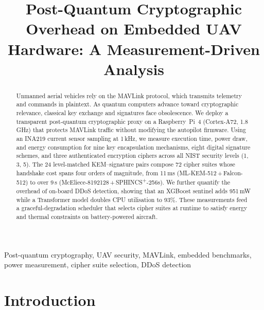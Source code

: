 \documentclass[conference]{IEEEtran}
\begin{document}
\title{Post-Quantum Cryptographic Overhead on Embedded UAV\\Hardware: A Measurement-Driven Analysis}

\author{}

\maketitle

\begin{abstract}
Unmanned aerial vehicles rely on the MAVLink protocol, which transmits
telemetry and commands in plaintext.  As quantum computers advance
toward cryptographic relevance, classical key exchange and signatures
face obsolescence.  We deploy a transparent post-quantum cryptographic
proxy on a Raspberry~Pi~4 (Cortex-A72, 1.8\,GHz) that protects
MAVLink traffic without modifying the autopilot firmware.  Using an
INA219 current sensor sampling at 1\,kHz, we measure execution time,
power draw, and energy consumption for nine key encapsulation
mechanisms, eight digital signature schemes, and three authenticated
encryption ciphers across all NIST security levels (1, 3, 5).
The 24 level-matched KEM--signature pairs compose 72 cipher suites
whose handshake cost spans four orders of magnitude, from 11\,ms
(ML-KEM-512\,+\,Falcon-512) to over 9\,s (McEliece-8192128\,+\,SPHINCS\textsuperscript{+}-256s).
We further quantify the overhead of on-board DDoS detection, showing
that an XGBoost sentinel adds 951\,mW while a Transformer model
doubles CPU utilisation to 93\%.  These measurements feed a graceful-degradation
scheduler that selects cipher suites at runtime to satisfy
energy and thermal constraints on battery-powered aircraft.
\end{abstract}

\begin{IEEEkeywords}
Post-quantum cryptography, UAV security, MAVLink, embedded benchmarks,
power measurement, cipher suite selection, DDoS detection
\end{IEEEkeywords}

\section{Introduction}
\label{sec:intro}
\end{document}
